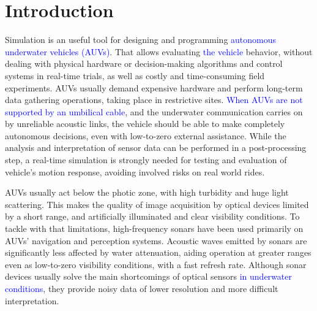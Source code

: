 \documentclass[final,5p,times]{elsarticle}
\begin{document}
\linenumbers

\section{Introduction}
\label{introduction}

Simulation is an useful tool for designing and programming \textcolor{blue}{autonomous underwater vehicles (AUVs)}. That allows evaluating \textcolor{blue}{the vehicle} behavior, without dealing with physical hardware or decision-making algorithms and control systems in real-time trials, as well as costly and time-consuming field experiments. AUVs usually demand expensive hardware and
perform long-term data gathering operations, taking place in restrictive
sites. \textcolor{blue}{When AUVs are not supported by an umbilical cable}, and the underwater communication carries on by unreliable acoustic links, the vehicle should be able to make completely autonomous decisions, even with low-to-zero external assistance.
While the analysis and interpretation of sensor data can be performed in a
post-processing step, a real-time simulation is strongly needed for testing
and evaluation of vehicle's motion response, avoiding involved risks on
real world rides.

AUVs usually act below the photic zone, with high turbidity and huge light
scattering. This makes the quality of image acquisition by optical devices
limited by a short range, and artificially illuminated and clear visibility
conditions. To tackle with that limitations, high-frequency sonars have been used
primarily on AUVs' navigation and perception systems. Acoustic waves emitted
by sonars are significantly less affected by water attenuation,
aiding operation at greater ranges even as low-to-zero visibility conditions,
with a fast refresh rate. Although sonar devices usually solve the main
shortcomings of optical sensors \textcolor{blue}{in underwater conditions}, they provide noisy data of lower resolution and more difficult interpretation.
\end{document}
